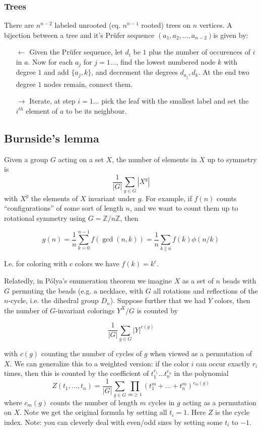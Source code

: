 \documentclass[
	a4paper,
	landscape,
	10pt,
	article
]{article}
\begin{document}
\subsubsection*{Trees}
There are $n^{n-2}$ labeled unrooted (cq. $n^{n-1}$ rooted) trees on $n$
vertices. A bijection between a tree and it's Pr\"ufer sequence
$(a_1, a_2, \dots, a_{n-2})$is given by:
\begin{enumerate}
	\item[$\leftarrow$] Given the Pr\"ufer sequence, let $d_i$ be $1$ plus the
		number of occurences of $i$ in $a$. Now for each $a_j$ for $j=1\dots$,
		find the lowest
		numbered node $k$ with degree $1$ and add $\{a_j, k\}$, and decrement
		the degrees $d_{a_j}, d_k$. At the end two degree $1$ nodes remain,
		connect them.
	\item[$\rightarrow$] Iterate, at step $i=1\dots$ pick the leaf with the
		smallest label and set the $i^{th}$ element of $a$ to be its
		neighbour.
\end{enumerate}

\subsection{Burnside's lemma}
Given a group $G$ acting on a set $X$, the number of elements in $X$ up to
symmetry is $$\frac{1}{|G|}\sum_{g\in G} |X^g|$$ with $X^g$ the elements of
$X$ invariant under $g$. For example, if $f(n)$ counts ``configurations''
of some sort of length $n$, and we want to count them up to rotational symmetry
using $G = \mathbb{Z}/n\mathbb{Z}$, then

$$g(n) = \frac{1}{n} \sum_{k=0}^{n-1} f(\gcd(n, k))
	= \frac{1}{n}\sum_{k \| n} f(k) \phi(n / k)$$

I.e. for coloring with $c$ colors we have $f(k) = k^c$.

Relatedly, in P\'olya's enumeration theorem we imagine $X$ as a set of $n$
beads with $G$ permuting the beads (e.g. a necklace, with $G$ all rotations and
reflections of the $n$-cycle, i.e. the dihedral group $D_n$).
Suppose further that we had $Y$ colors, then
the number of $G$-invariant colorings $Y^X / G$ is counted by

$$\frac{1}{|G|}\sum_{g\in G} |Y|^{c(g)}$$

with $c(g)$ counting the number of cycles of $g$ when viewed as a permutation
of $X$. We can generalize this to a weighted version: if the color $i$ can
occur exactly $r_i$ times, then this is counted by the coefficient of
$t_1^{r_1}\dots t_n^{r_n}$ in the polynomial
$$Z(t_1,\dots,t_n) = \frac{1}{|G|}\sum_{g\in G} \prod_{m\geq 1}
	(t_1^m+\dots+t_n^m)^{c_m(g)}$$
where $c_m(g)$ counts the number of length $m$ cycles in $g$ acting as a
permutation on $X$. Note we get the original formula by setting all $t_i=1$.
Here $Z$ is the cycle index. Note: you can cleverly deal with even/odd sizes
by setting some $t_i$ to $-1$.
\end{document}
